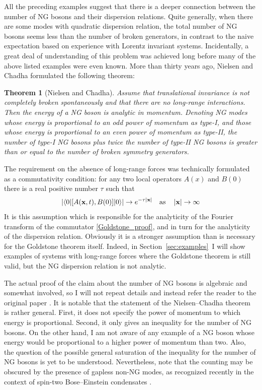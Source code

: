 \documentclass[final,3p,times,12pt,a4paper,sort&compress]{elsarticle}
\newcommand\vek[1]{{\boldsymbol{\bf #1}}}   %
\newcommand\bra[1]{\langle#1\vert}          %
\newcommand\ket[1]{\vert#1\rangle}          %
\newcommand\thname{Theorem}
\newtheorem{theorem}{\thname}
\newcommand\abs[1]{\left|#1\right|}         %
\begin{document}
All the preceding examples suggest that there is a deeper connection between
the number of NG bosons and their dispersion relations. Quite generally, when
there are some modes with quadratic dispersion relation, the total number of NG
bosons seems less than the number of broken generators, in contrast to the
naive expectation based on experience with Lorentz invariant systems.
Incidentally, a great deal of understanding of this problem was achieved long
before many of the above listed examples were even known. More than thirty
years ago, Nielsen and Chadha \cite{Nielsen:1975hm} formulated the following
theorem:
\begin{theorem}[Nielsen and Chadha]
\label{thm:NC}
Assume that translational invariance is not completely broken spontaneously and
that there are no long-range interactions. Then the energy of a NG boson is
analytic in momentum. Denoting NG modes whose energy is proportional to an odd
power of momentum as type-I, and those whose energy is proportional to an even
power of momentum as type-II, \emph{the number of type-I NG bosons plus twice
the number of type-II NG bosons is greater than or equal to the number of broken
symmetry generators.}
\end{theorem}
The requirement on the absence of long-range forces was technically formulated
as a commutativity condition: for any two local operators $A(x)$ and $B(0)$
there is a real positive number $\tau$ such that
\begin{equation}
\abs{\bra0[A(\vek x,t),B(0)]\ket0}\to e^{-\tau\abs{\vek x}}\quad
\text{as}\quad\abs{\vek x}\to\infty
\end{equation}
It is this assumption which is responsible for the analyticity of the Fourier
transform of the commutator \eqref{Goldstone_proof}, and in turn for the
analyticity of the dispersion relation. Obviously it is a stronger assumption
than is necessary for the Goldstone theorem itself. Indeed, in
Section~\ref{sec:examples}\ I will show examples of systems with long-range
forces where the Goldstone theorem is still valid, but the NG dispersion
relation is not analytic.

The actual proof of the claim about the number of NG bosons is algebraic and
somewhat involved, so I will not repeat details and instead refer the reader to
the original paper \cite{Nielsen:1975hm}. It is notable that the statement
of the Nielsen--Chadha theorem is rather general. First, it does not specify the
power of momentum to which energy is proportional. Second, it only gives an
inequality for the number of NG bosons. On the other hand, I am not aware of
any example of a NG boson whose energy would be proportional to a higher power
of momentum than two. Also, the question of the possible general saturation of
the inequality for the number of NG bosons is yet to be understood.
Nevertheless, note that the counting may be obscured by the presence of gapless
non-NG modes, as recognized recently in the context of spin-two Bose--Einstein
condensates \cite{Uchino:2009ya}.
\end{document}
